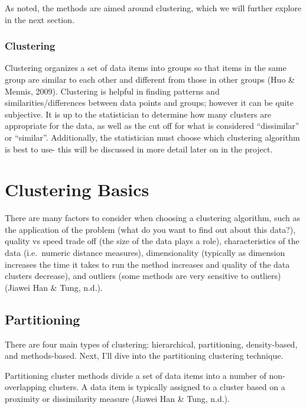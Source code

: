 \documentclass[12pt,twoside]{amherstthesis}
\begin{document}
  As noted, the methods are aimed around clustering, which we will further
  explore in the next section.
  
  \subsection{Clustering}\label{clustering}
  
  Clustering organizes a set of data items into groups so that items in
  the same group are similar to each other and different from those in
  other groups (Huo \& Mennis, 2009). Clustering is helpful in finding
  patterns and similarities/differences between data points and groups;
  however it can be quite subjective. It is up to the statistician to
  determine how many clusters are appropriate for the data, as well as the
  cut off for what is considered ``dissimilar'' or ``similar''.
  Additionally, the statistician must choose which clustering algorithm is
  best to use- this will be discussed in more detail later on in the
  project.
  
  \chapter{Clustering Basics}\label{rmd-basics}
  
  There are many factors to consider when choosing a clustering algorithm,
  such as the application of the problem (what do you want to find out
  about this data?), quality vs speed trade off (the size of the data
  plays a role), characteristics of the data (i.e.~numeric distance
  measures), dimensionality (typically as dimension increases the time it
  takes to run the method increases and quality of the data clusters
  decrease), and outliers (some methods are very sensitive to outliers)
  (Jiawei Han \& Tung, n.d.).
  
  \section{Partitioning}\label{partitioning}
  
  There are four main types of clustering: hierarchical, partitioning,
  density-based, and methods-based. Next, I'll dive into the partitioning
  clustering technique.
  
  Partitioning cluster methods divide a set of data items into a number of
  non-overlapping clusters. A data item is typically assigned to a cluster
  based on a proximity or dissimilarity measure (Jiawei Han \& Tung,
  n.d.).
  
\end{document}
